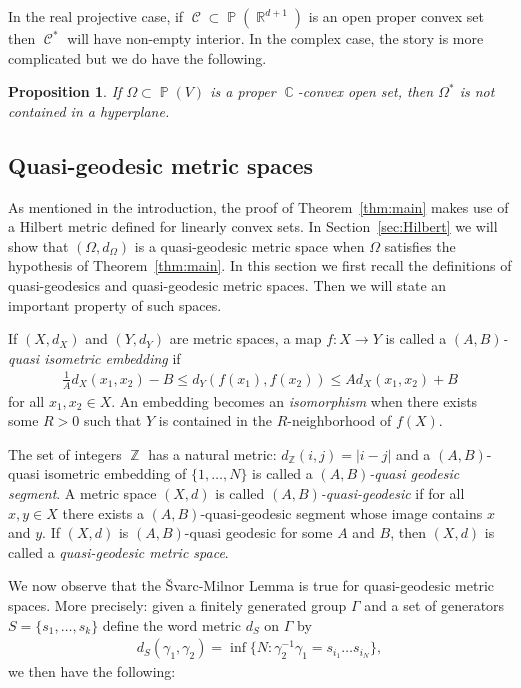 \documentclass[12pt]{amsart}
\theoremstyle{plain}
\newtheorem{proposition}{Proposition}[section]
\theoremstyle{definition}
\theoremstyle{remark}
\begin{document}
In the real projective case, if $\operatorname{\mathcal{C}} \subset \operatorname{\mathbb{P}}(\operatorname{\mathbb{R}}^{d+1})$ is an open proper convex set then $\operatorname{\mathcal{C}}^*$ will have non-empty interior. In the complex case, the story is more complicated but we do have the following.

\begin{proposition}
\label{prop:zar_den}\cite[Proposition 2.3.10]{APS2004}
If $\Omega \subset \operatorname{\mathbb{P}}(V)$ is a proper $\operatorname{\mathbb{C}}$-convex open set, then $\Omega^*$ is not contained in a hyperplane.
\end{proposition}

\subsection{Quasi-geodesic metric spaces} As mentioned in the introduction, the proof of Theorem~\ref{thm:main} makes use of a Hilbert metric defined for linearly convex sets. In Section~\ref{sec:Hilbert} we will show that $(\Omega,d_{\Omega})$ is a quasi-geodesic metric space when $\Omega$ satisfies the hypothesis of Theorem~\ref{thm:main}. In this section we first recall the definitions of quasi-geodesics and quasi-geodesic metric spaces. Then we will state an important property of such spaces.

If $(X,d_X)$ and $(Y,d_Y)$ are metric spaces, a map $f: X \rightarrow Y$ is called a \emph{$(A,B)$-quasi isometric embedding} if 
\begin{align*}
 \frac{1}{A}d_X(x_1,x_2) -B \leq d_Y(f(x_1),f(x_2)) \leq A d_X(x_1,x_2) + B
\end{align*}
for all $x_1,x_2 \in X$. An embedding becomes an \emph{isomorphism} when there exists some $R>0$ such that $Y$ is contained in the $R$-neighborhood of $f(X)$.

The set of integers $\operatorname{\mathbb{Z}}$ has a natural metric: $d_\operatorname{\mathbb{Z}}(i,j) = {\left|{i-j}\right|}$ and a $(A,B)$-quasi isometric embedding of $\{1,\dots,N\}$ is called a \emph{$(A,B)$-quasi geodesic segment}. A metric space $(X,d)$ is called \emph{$(A,B)$-quasi-geodesic} if for all $x,y \in X$ there exists a $(A,B)$-quasi-geodesic segment whose image contains $x$ and $y$. If $(X,d)$ is $(A,B)$-quasi geodesic for some $A$ and $B$, then $(X,d)$ is called a \emph{quasi-geodesic metric space}.

We now observe that the \v{S}varc-Milnor Lemma is true for quasi-geodesic metric spaces. More precisely: given a finitely generated group $\Gamma$ and a set of generators $S=\{s_1, \dots, s_k\}$ define the word metric $d_S$ on $\Gamma$ by 
\begin{align*}
d_S(\gamma_1,\gamma_2) = \inf \{ N : \gamma_2^{-1}\gamma_1 = s_{i_1} \dots s_{i_N} \},
\end{align*}
we then have the following:
\end{document}
